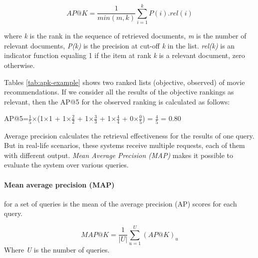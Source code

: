 \begin{equation}
    AP@K = \frac{1}{min(m,k)}\sum_{i=1}^{k}P(i).rel(i)
    \label{eq:ap@k}
\end{equation}

where \emph{k} is the rank in the sequence of retrieved documents, \emph{m} is the number of relevant documents, \emph{P(k)} is the precision at cut-off \emph{k} in the list. \emph{rel(k)}
is an indicator function equaling 1 if the item at rank \emph{k} is a relevant document, zero otherwise.

Tables \ref{tab:apk-example} shows two ranked lists (objective, observed) of movie recommendations. If we consider all the results of the objective rankings as relevant, then the AP@5 for the observed ranking is calculated as follows:

AP@5=$\frac{1}{5}$$\times$(1$\times$1 + 1$\times$$\frac{2}{2}$ + 1$\times$$\frac{3}{3}$ + 1$\times$$\frac{4}{4}$ + 0$\times$$\frac{0}{5}$) = $\frac{4}{5}$ = 0.80

Average precision calculates the retrieval effectiveness for the results of one query. But in real-life scenarios, these systems receive multiple requests, each of them with different output. \emph{Mean Average Precision (MAP)} makes it possible to evaluate the system over various queries.

\paragraph*{Mean average precision (MAP)} for a set of queries is the mean of the average precision (AP) scores for each query.

\begin{equation}
    MAP@K = \frac{1}{|U|}\sum_{u=1}^{U}(AP@K)_{u}
    \label{eq:map@k}
\end{equation}
Where \emph{U} is the number of queries.

